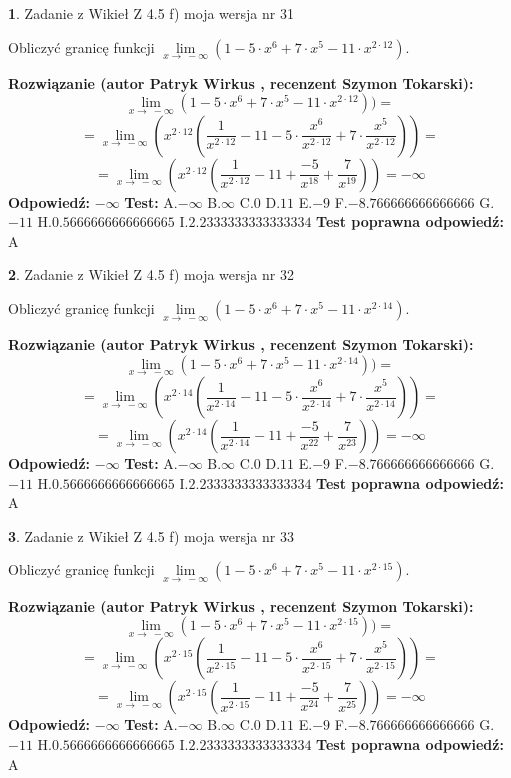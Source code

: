 \documentclass[12pt, a4paper]{article}
\theoremstyle{definition} %
\newtheorem{zad}{}
\newcommand{\zadStart}[1]{\begin{zad}#1\newline}
\newcommand{\zadStop}{\end{zad}}
\newcommand{\rozwStart}[2]{\noindent \textbf{Rozwiązanie (autor #1 , recenzent #2): }\newline}
\newcommand{\rozwStop}{\newline}
\newcommand{\odpStart}{\noindent \textbf{Odpowiedź:}\newline}
\newcommand{\odpStop}{\newline}
\newcommand{\testStart}{\noindent \textbf{Test:}\newline}
\newcommand{\testStop}{\newline}
\newcommand{\kluczStart}{\noindent \textbf{Test poprawna odpowiedź:}\newline}
\newcommand{\kluczStop}{\newline}
\begin{document}
\zadStart{Zadanie z Wikieł Z 4.5 f) moja wersja nr 31}


Obliczyć granicę funkcji  $\lim\limits_{x\to\ -\infty}(1 - 5 \cdot x^{6}+7 \cdot x^{5}- 11 \cdot x^{2\cdot12})$.
\zadStop
\rozwStart{Patryk Wirkus}{Szymon Tokarski}
$$\lim\limits_{x\to\ -\infty}(1 - 5 \cdot x^{6}+7 \cdot x^{5}- 11 \cdot x^{2\cdot12}))=$$
$$=\lim\limits_{x\to\ -\infty}(x^{2\cdot12}(\frac{1}{x^{2\cdot12}}-11 -5 \cdot \frac{x^{6}}{x^{2\cdot12}}+7 \cdot \frac{x^{5}}{x^{2\cdot12}}))=$$
$$=\lim\limits_{x\to\ -\infty}(x^{2\cdot12}(\frac{1}{x^{2\cdot12}}-11 + \frac{-5}{x^{18}}+ \frac{7}{x^{19}}))=-\infty$$
\rozwStop
\odpStart
$-\infty$
\odpStop
\testStart
A.$-\infty$ B.$\infty$ C.$0$ D.$11$ E.$-9$
F.$-8.766666666666666$ G.$-11$
H.$0.5666666666666665$
I.$2.2333333333333334$
\testStop
\kluczStart
A
\kluczStop



\zadStart{Zadanie z Wikieł Z 4.5 f) moja wersja nr 32}


Obliczyć granicę funkcji  $\lim\limits_{x\to\ -\infty}(1 - 5 \cdot x^{6}+7 \cdot x^{5}- 11 \cdot x^{2\cdot14})$.
\zadStop
\rozwStart{Patryk Wirkus}{Szymon Tokarski}
$$\lim\limits_{x\to\ -\infty}(1 - 5 \cdot x^{6}+7 \cdot x^{5}- 11 \cdot x^{2\cdot14}))=$$
$$=\lim\limits_{x\to\ -\infty}(x^{2\cdot14}(\frac{1}{x^{2\cdot14}}-11 -5 \cdot \frac{x^{6}}{x^{2\cdot14}}+7 \cdot \frac{x^{5}}{x^{2\cdot14}}))=$$
$$=\lim\limits_{x\to\ -\infty}(x^{2\cdot14}(\frac{1}{x^{2\cdot14}}-11 + \frac{-5}{x^{22}}+ \frac{7}{x^{23}}))=-\infty$$
\rozwStop
\odpStart
$-\infty$
\odpStop
\testStart
A.$-\infty$ B.$\infty$ C.$0$ D.$11$ E.$-9$
F.$-8.766666666666666$ G.$-11$
H.$0.5666666666666665$
I.$2.2333333333333334$
\testStop
\kluczStart
A
\kluczStop



\zadStart{Zadanie z Wikieł Z 4.5 f) moja wersja nr 33}


Obliczyć granicę funkcji  $\lim\limits_{x\to\ -\infty}(1 - 5 \cdot x^{6}+7 \cdot x^{5}- 11 \cdot x^{2\cdot15})$.
\zadStop
\rozwStart{Patryk Wirkus}{Szymon Tokarski}
$$\lim\limits_{x\to\ -\infty}(1 - 5 \cdot x^{6}+7 \cdot x^{5}- 11 \cdot x^{2\cdot15}))=$$
$$=\lim\limits_{x\to\ -\infty}(x^{2\cdot15}(\frac{1}{x^{2\cdot15}}-11 -5 \cdot \frac{x^{6}}{x^{2\cdot15}}+7 \cdot \frac{x^{5}}{x^{2\cdot15}}))=$$
$$=\lim\limits_{x\to\ -\infty}(x^{2\cdot15}(\frac{1}{x^{2\cdot15}}-11 + \frac{-5}{x^{24}}+ \frac{7}{x^{25}}))=-\infty$$
\rozwStop
\odpStart
$-\infty$
\odpStop
\testStart
A.$-\infty$ B.$\infty$ C.$0$ D.$11$ E.$-9$
F.$-8.766666666666666$ G.$-11$
H.$0.5666666666666665$
I.$2.2333333333333334$
\testStop
\kluczStart
A
\kluczStop
\end{document}
